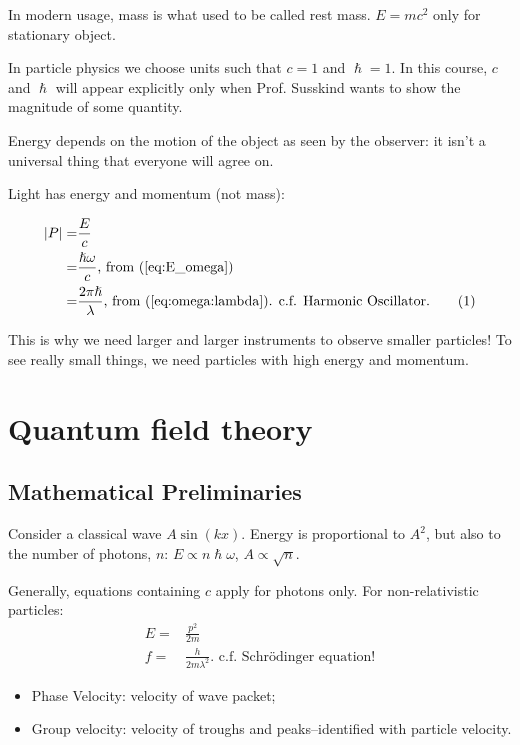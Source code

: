 \documentclass[]{article}
\newcommand\numberthis{\addtocounter{equation}{1}\tag{\theequation}}
\begin{document}
In modern usage, mass is what used to be called rest mass. $E = m c^2$ only for stationary object.

In particle physics we choose units such that $c=1$ and $\hslash=1$. In this course, $c$ and $\hslash$ will appear explicitly only when Prof. Susskind wants to show the magnitude of some quantity.

Energy depends on the motion of the object as seen by the observer: it isn't a universal thing that everyone will agree on.

Light has energy and momentum (not mass): 

\begin{align*}
\left|P\right|=&\frac{E}{c} \\
=&\frac{\hslash \omega}{c} \text{, from (\ref{eq:E_omega})}\\
=& \frac{2 \pi \hslash}{\lambda} \text{, from (\ref{eq:omega:lambda}). c.f. Harmonic Oscillator.}\numberthis\label{eq:P:lambda}
\end{align*}

This is why we need larger and larger instruments to observe smaller particles!
To see really small things, we need particles with high energy and momentum.


\section{Quantum field theory}

\subsection{Mathematical Preliminaries}

Consider a classical wave $A \sin(kx)$. Energy is proportional to $A^2$, but also to the number of photons, $n$: $E \propto n \hslash \omega$, $A \propto \sqrt{n}$.

Generally, equations containing $c$ apply for photons only. For non-relativistic particles:
\begin{align*}
E=&\frac{p^2}{2m}\\
f =& \frac{h}{2 m \lambda^2} \text{. c.f. Schr\"odinger equation!}
\end{align*}

\begin{itemize}
	\item Phase Velocity: velocity of wave packet;
	\item Group velocity: velocity of troughs and peaks--identified with particle velocity.
\end{itemize}
\end{document}
